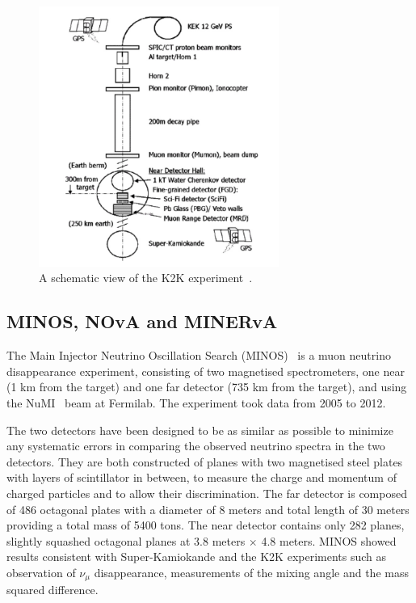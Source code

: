 \begin{figure}[h!]
\centering
  \centering
\includegraphics[width=0.7\textwidth]{figures/KEK.jpeg}
\vspace{2mm}
\caption{A schematic view of the K2K experiment~\cite{70K2K}.}
\label{fig:K2K}
\end{figure}

\subsection{MINOS, NOvA and MINERvA}

The Main Injector Neutrino Oscillation Search (MINOS)~\cite{MINOS} is a muon neutrino disappearance experiment, consisting of two magnetised spectrometers, one near (1 km from the target) and one far detector (735 km from the target), and using the NuMI~\cite{19NuMI} beam at Fermilab. The experiment took data from 2005 to 2012.

The two detectors have been designed to be as similar as possible to minimize any systematic errors in comparing the observed neutrino spectra in the two detectors. They are both constructed of planes with two magnetised steel plates with layers of scintillator in between, to measure the charge and momentum of charged particles and to allow their discrimination. The far detector is composed of 486 octagonal plates with a diameter of 8 meters and total length of 30 meters providing a total mass of 5400 tons. The near detector contains only 282 planes, slightly squashed octagonal planes at 3.8 meters $\times$ 4.8 meters. MINOS showed results consistent with Super-Kamiokande and the K2K experiments such as observation of $\nu_\mu$ disappearance, measurements of the mixing angle and the mass squared difference.

